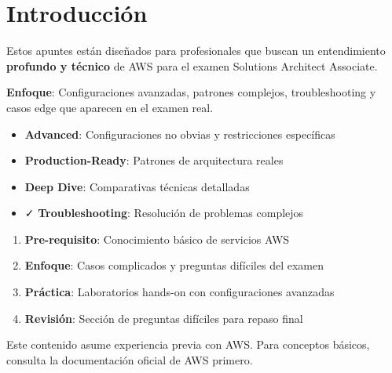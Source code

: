 \documentclass[12pt,a4paper]{report}
\begin{document}
\tableofcontents
\newpage

\chapter*{Introducción}

\begin{awsbox}
Estos apuntes están diseñados para profesionales que buscan un entendimiento \textbf{profundo y técnico} de AWS para el examen Solutions Architect Associate.

\textbf{Enfoque}: Configuraciones avanzadas, patrones complejos, troubleshooting y casos edge que aparecen en el examen real.
\end{awsbox}

\begin{conceptbox}
\begin{itemize}
    \item \textcolor{dangerred}{\faExclamationTriangle} \textbf{Advanced}: Configuraciones no obvias y restricciones específicas
    \item \textcolor{awsorange}{\faCode} \textbf{Production-Ready}: Patrones de arquitectura reales
    \item \textcolor{awsblue}{\faCog} \textbf{Deep Dive}: Comparativas técnicas detalladas
    \item \textcolor{successgreen}{\faCheck} \textbf{Troubleshooting}: Resolución de problemas complejos
\end{itemize}
\end{conceptbox}

\begin{tipbox}
\begin{enumerate}
    \item \textbf{Pre-requisito}: Conocimiento básico de servicios AWS
    \item \textbf{Enfoque}: Casos complicados y preguntas difíciles del examen
    \item \textbf{Práctica}: Laboratorios hands-on con configuraciones avanzadas
    \item \textbf{Revisión}: Sección de preguntas difíciles para repaso final
\end{enumerate}
\end{tipbox}

\begin{warningbox}[Advertencia]
Este contenido asume experiencia previa con AWS. Para conceptos básicos, consulta la documentación oficial de AWS primero.
\end{warningbox}
\end{document}
